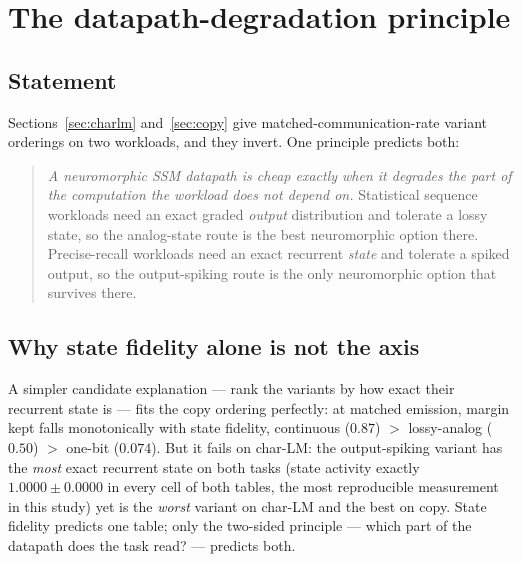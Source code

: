 
\section{The datapath-degradation principle}
\label{sec:principle}

\subsection{Statement}
\label{sec:principle-statement}

Sections~\ref{sec:charlm} and~\ref{sec:copy} give matched-communication-rate variant
orderings on two workloads, and they invert. One principle predicts both:

\begin{quote}
\emph{A neuromorphic SSM datapath is cheap exactly when it degrades the part of the
computation the workload does not depend on.} Statistical sequence workloads need an exact
graded \emph{output} distribution and tolerate a lossy state, so the analog-state route is
the best neuromorphic option there. Precise-recall workloads need an exact recurrent
\emph{state} and tolerate a spiked output, so the output-spiking route is the only
neuromorphic option that survives there.
\end{quote}

\subsection{Why state fidelity alone is not the axis}
\label{sec:principle-fidelity}

A simpler candidate explanation --- rank the variants by how exact their recurrent state is
--- fits the copy ordering perfectly: at matched emission, margin kept falls monotonically
with state fidelity, continuous ($0.87$) $>$ lossy-analog ($0.50$) $>$ one-bit ($0.074$). But
it fails on char-LM: the output-spiking variant has the \emph{most} exact recurrent state on
both tasks (state activity exactly $1.0000 \pm 0.0000$ in every cell of both tables, the most
reproducible measurement in this study) yet is the \emph{worst} variant on char-LM and the
best on copy. State fidelity predicts one table; only the two-sided principle --- which part
of the datapath does the task read? --- predicts both.

